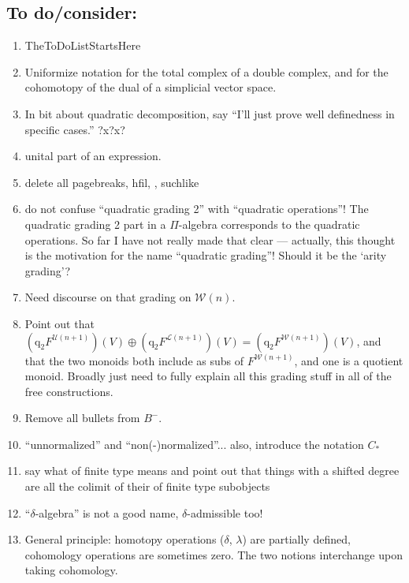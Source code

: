 \documentclass[11pt]{amsart} \renewcommand{\baselinestretch}{1.2}
\theoremstyle{plain}
\theoremstyle{definition}
\newcommand{\DASH}{\mathrm{-}}
\newcommand{\squishlist}{
  \setlength{\itemsep}{.5pt}
  \setlength{\parskip}{0pt}
  \setlength{\parsep}{0pt}}
\newcommand{\calU}{\mathcal{U}}
\newcommand{\calL}{\mathcal{L}}
\newcommand{\calw}{\mathcal{W}}
\newcommand{\calc}{\mathcal{C}}
\newcommand{\quadgrad}[1]{\mathrm{q}_{#1}}
\begin{document}
\begin{todolist}
\section{\textbf{To do/consider:}}
\begin{enumerate}\squishlist
\setlength{\parindent}{.25in}
\item TheToDoListStartsHere
\item Uniformize notation for the total complex of a double complex, and for the cohomotopy of the dual of a simplicial vector space.
\item In bit about quadratic decomposition, say ``I'll just prove well definedness in specific cases.'' ?x?x?
\item unital part of an expression.
\item delete all pagebreaks, hfil, \textbf{}, suchlike
\item do not confuse ``quadratic grading 2'' with ``quadratic operations''! The quadratic grading 2 part in a $\Pi$-algebra corresponds to the quadratic operations. So far I have not really made that clear --- actually, this thought is the motivation for the name ``quadratic grading''! Should it be the `arity grading'?
\item Need discourse on that grading on $\calw(n)$.
\item Point out that $(\quadgrad{2}F^{\calU(n+1)})(V)\oplus (\quadgrad{2}F^{\calL(n+1)})(V)=(\quadgrad{2}F^{\calw(n+1)})(V)$, and that the two monoids both include as subs of $F^{\calw(n+1)}$, and one is a quotient monoid. Broadly just need to fully explain all this grading stuff in all of the free constructions.
\item Remove all bullets from $B^{\DASH}.$
\item ``unnormalized'' and ``non(-)normalized''... also, introduce the notation $C_*$
\item say what  of finite type means and point out that things with a shifted degree are all the colimit of their  of finite type subobjects
\item ``$\delta$-algebra'' is not a good name, $\delta$-admissible too!
\item General principle: homotopy operations ($\delta$, {$\lambda$}) are partially defined, cohomology operations are sometimes zero. The two notions interchange upon taking cohomology.

\end{enumerate}
\end{todolist}
\end{document}
